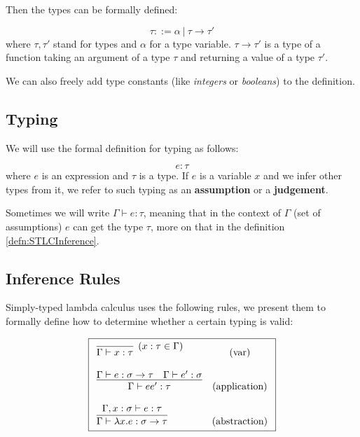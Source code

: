 Then the types can be formally defined:

\begin{defn}[Type]
    \label{defn:typeSTLC}
    $$\tau ::= \alpha\ |\ \tau \rightarrow \tau'$$
    where $\tau, \tau'$ stand for types and $\alpha$ for a type variable. $\tau \rightarrow \tau'$ is a type of a function taking an argument of a type $\tau$ and returning a value of a type $\tau'$.
\end{defn}

We can also freely add type constants (like \emph{integers} or \emph{booleans}) to the definition.

\subsection{Typing}

We will use the formal definition for typing as follows:

\begin{defn}
    \label{defn:typingSTLC}
    $$e : \tau$$
    where $e$ is an expression and $\tau$ is a type. If $e$ is a variable $x$ and we infer other types from it, we refer to such typing as an \textbf{assumption} or a \textbf{judgement}.
\end{defn}

Sometimes we will write $\Gamma \vdash e : \tau$, meaning that in the context of $\Gamma$ (set of assumptions) $e$ can get the type $\tau$, more on that in the definition \ref{defn:STLCInference}.

\subsection{Inference Rules}

Simply-typed lambda calculus uses the following rules, we present them to formally define how to determine whether a certain typing is valid:

\begin{defn}
    \label{defn:STLCInference}
    $$\boxed{\begin{array}{l c}
        \infer[(x : \tau \in \Gamma)]{\Gamma \vdash x : \tau}{} & (\text{var}) \\\\
        \infer{\Gamma \vdash e e' : \tau}{\Gamma \vdash e : \sigma \rightarrow \tau \quad \Gamma \vdash e' : \sigma} & (\text{application}) \\\\
        \infer{\Gamma \vdash \lambda x . e : \sigma \rightarrow \tau}{\Gamma, x : \sigma \vdash e : \tau} & (\text{abstraction})
    \end{array}}$$
\end{defn}

